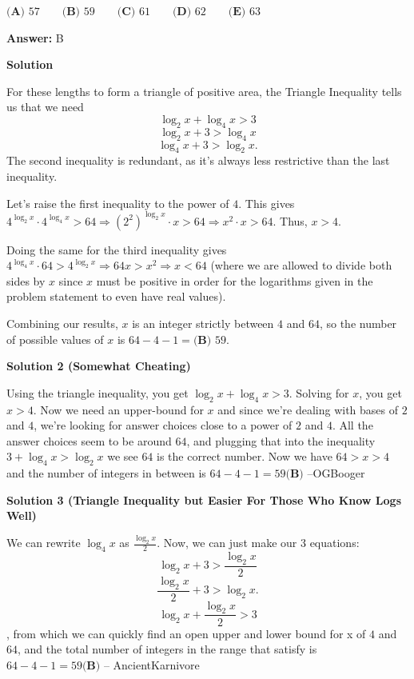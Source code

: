 \begin{enumerate}
 $\textbf{(A) } 57\qquad \textbf{(B) } 59\qquad \textbf{(C) } 61\qquad \textbf{(D) } 62\qquad \textbf{(E) } 63$

 \textbf{Answer: }B



\textbf{Solution}

For these lengths to form a triangle of positive area, the Triangle Inequality tells us that we need 
 \[\log_2{x} + \log_4{x} > 3\] 
 \[\log_2{x} + 3 > \log_4{x}\] 
 \[\log_4{x} + 3 > \log_2{x}.\] The second inequality is redundant, as it's always less restrictive than the last inequality. 

 Let's raise the first inequality to the power of $4$. This gives $4^{\log_2{x}} \cdot 4^{\log_4{x}} > 64 \Rightarrow \left(2^2\right)^{\log_2{x}} \cdot x > 64 \Rightarrow x^2 \cdot x > 64$. Thus, $x > 4$. 

 Doing the same for the third inequality gives $4^{\log_4{x}} \cdot 64 > 4^{\log_2{x}} \Rightarrow 64x > x^2 \Rightarrow x < 64$ (where we are allowed to divide both sides by $x$ since $x$ must be positive in order for the logarithms given in the problem statement to even have real values).

 Combining our results, $x$ is an integer strictly between $4$ and $64$, so the number of possible values of $x$ is $64 - 4 - 1 = \boxed{\textbf{(B) } 59}$.

 



\textbf{Solution 2 (Somewhat Cheating)}

Using the triangle inequality, you get $\log_2{x}+\log_4{x} > 3$. Solving for $x$, you get $x > 4$. Now we need an upper-bound for $x$ and since we're dealing with bases of $2$ and $4$, we're looking for answer choices close to a power of $2$ and $4$. All the answer choices seem to be around $64$, and plugging that into the inequality $3+\log_4{x} > \log_2{x}$ we see $64$ is the correct number. Now we have $64 > x > 4$ and the number of integers in between is $64-4-1 = \boxed{{59 \textbf{(B)}}}$ --OGBooger

 


 



\textbf{Solution 3 (Triangle Inequality but Easier For Those Who Know Logs Well)}

We can rewrite  $\log_4{x}$ as $\frac{\log_2{x}}{2}$. Now, we can just make our 3 equations:
 \[\log_2{x} + 3 > \frac{\log_2{x}}{2}\] 
 \[\frac{\log_2{x}}{2}+ 3 > \log_2{x}.\] 
 \[\log_2{x} + \frac{\log_2{x}}{2}> 3\], from which we can quickly find an open upper and lower bound for x of $4$ and $64$, and the total number of integers in the range that satisfy is  $64-4-1 = \boxed{{59 \textbf{(B)}}}$ -- AncientKarnivore


\end{enumerate}
